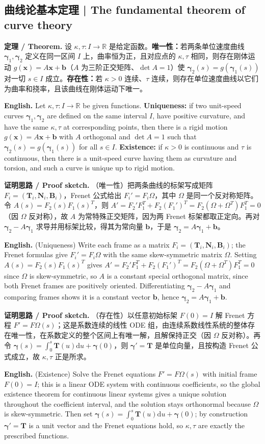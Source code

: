 \documentclass[UTF8,11pt,a4paper]{ctexart}
\newcommand{\EN}[1]{\par\noindent \textbf{English.} #1\par}
\newcommand{\THM}[2]{\par\noindent\textbf{定理 / Theorem.} #1\par\EN{#2}\par\smallskip}
\newcommand{\PROOF}[2]{\par\noindent\textbf{证明思路 / Proof sketch.} #1\par\EN{#2}\par\smallskip}
\newcommand{\dd}{\mathrm{d}}
\newcommand{\RR}{\mathbb{R}}
\newcommand{\bT}{\mathbf{T}}
\newcommand{\bN}{\mathbf{N}}
\newcommand{\bB}{\mathbf{B}}
\newcommand{\bb}{\mathbf{b}}
\newcommand{\bx}{\mathbf{x}}
\newcommand{\bgamma}{\boldsymbol{\gamma}}
\begin{document}
\subsection{曲线论基本定理 | The fundamental theorem of curve theory}
\THM{设 $\kappa,\tau:I\to\RR$ 是给定函数。\textbf{唯一性：}若两条单位速度曲线 $\bgamma_1,\bgamma_2$ 定义在同一区间 $I$ 上，曲率恒为正，且对应点的 $\kappa,\tau$ 相同，则存在刚体运动 $g(\bx)=A\bx+\bb$（$A$ 为三阶正交矩阵、$\det A=1$）使 $\bgamma_2(s)=g(\bgamma_1(s))$ 对一切 $s\in I$ 成立。\textbf{存在性：}若 $\kappa>0$ 连续、$\tau$ 连续，则存在单位速度曲线以它们为曲率和挠率，且该曲线在刚体运动下唯一。}{Let $\kappa,\tau:I\to\RR$ be given functions. \textbf{Uniqueness:} if two unit-speed curves $\bgamma_1,\bgamma_2$ are defined on the same interval $I$, have positive curvature, and have the same $\kappa,\tau$ at corresponding points, then there is a rigid motion $g(\bx)=A\bx+\bb$ with $A$ orthogonal and $\det A=1$ such that $\bgamma_2(s)=g(\bgamma_1(s))$ for all $s\in I$. \textbf{Existence:} if $\kappa>0$ is continuous and $\tau$ is continuous, then there is a unit-speed curve having them as curvature and torsion, and such a curve is unique up to rigid motion.}
\PROOF{（唯一性）把两条曲线的标架写成矩阵 $F_i=(\bT_i,\bN_i,\bB_i)$，Frenet 公式给出 $F_i'=F_i\Omega$，其中 $\Omega$ 是同一个反对称矩阵。令 $A(s)=F_2(s)F_1(s)^T$，则 $A'=F_2'F_1^T+F_2(F_1')^T=F_2(\Omega+\Omega^T)F_1^T=0$（因 $\Omega$ 反对称），故 $A$ 为常特殊正交矩阵，因为两 Frenet 标架都取正定向。再对 $\bgamma_2-A\bgamma_1$ 求导并用标架比较，得其为常向量 $\bb$，于是 $\bgamma_2=A\bgamma_1+\bb$。}{(Uniqueness) Write each frame as a matrix $F_i=(\bT_i,\bN_i,\bB_i)$; the Frenet formulas give $F_i'=F_i\Omega$ with the same skew-symmetric matrix $\Omega$. Setting $A(s)=F_2(s)F_1(s)^T$ gives $A'=F_2'F_1^T+F_2(F_1')^T=F_2(\Omega+\Omega^T)F_1^T=0$ since $\Omega$ is skew-symmetric, so $A$ is a constant special orthogonal matrix, since both Frenet frames are positively oriented. Differentiating $\bgamma_2-A\bgamma_1$ and comparing frames shows it is a constant vector $\bb$, hence $\bgamma_2=A\bgamma_1+\bb$.}
\PROOF{（存在性）以任意初始标架 $F(0)=I$ 解 Frenet 方程 $F'=F\Omega(s)$；这是系数连续的线性 ODE 组，由连续系数线性系统的整体存在唯一性，在系数定义的整个区间上有唯一解，且解保持正交（因 $\Omega$ 反对称）。再令 $\bgamma(s)=\int_0^s\bT(u)\dd u+\bgamma(0)$，则 $\bgamma'=\bT$ 是单位向量，且按构造 Frenet 公式成立，故 $\kappa,\tau$ 正是所求。}{(Existence) Solve the Frenet equations $F'=F\Omega(s)$ with initial frame $F(0)=I$; this is a linear ODE system with continuous coefficients, so the global existence theorem for continuous linear systems gives a unique solution throughout the coefficient interval, and the solution stays orthonormal because $\Omega$ is skew-symmetric. Then set $\bgamma(s)=\int_0^s\bT(u)\dd u+\bgamma(0)$; by construction $\bgamma'=\bT$ is a unit vector and the Frenet equations hold, so $\kappa,\tau$ are exactly the prescribed functions.}
\end{document}
